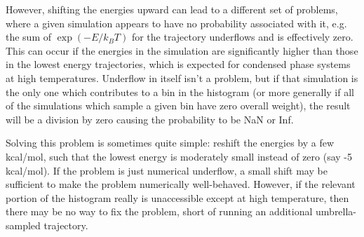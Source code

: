 \documentclass[12pt]{article}
\begin{document}
However, shifting the energies upward can lead to a different set of
problems, where a given simulation appears to have no probability associated
with it, e.g. the sum of $\exp(-E/k_B T)$ for the trajectory underflows and
is effectively zero.  This can occur if the energies in the simulation are
significantly higher than those in the lowest energy trajectories, which is
expected for condensed phase systems at high temperatures. Underflow in
itself isn't a problem, but if that simulation is the only one which
contributes to a bin in the histogram (or more generally if all of the
simulations which sample a given bin have zero overall weight), the result
will be a division by zero causing the probability to be NaN or Inf.  

Solving this problem is sometimes quite simple: reshift the energies by a few
kcal/mol, such that the lowest energy is moderately small instead of zero
(say -5 kcal/mol).  If the problem is just numerical underflow, a small shift
may be sufficient to make the problem numerically well-behaved.  However, if
the relevant portion of the histogram really is unaccessible except at high
temperature, then there may be no way to fix the problem, short of running an
additional umbrella-sampled trajectory.
\end{document}
